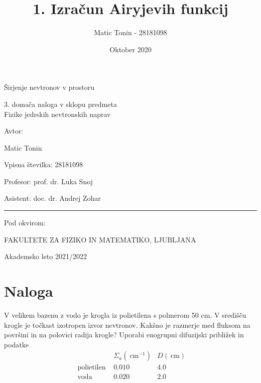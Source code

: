 \documentclass[slovene,11pt,a4paper]{article}
\title{1. Izračun Airyjevih funkcij}
\author{Matic Tonin - 28181098 }
\date{Oktober 2020}
\begin{document}
\begin{center}
\thispagestyle{empty}
\parskip=14pt%
\vspace*{3\parskip}%
\begin{Huge}Širjenje nevtronov v prostoru\end{Huge}


3. domača naloga v sklopu predmeta \\
Fizike jedrskih nevtronskih naprav

Avtor:

Matic Tonin

Vpisna številka: 28181098

Profesor: prof. dr. Luka Snoj

Asistent: doc. dr. Andrej Zohar


\rule{7cm}{0.4pt}

Pod okvirom:

FAKULTETE ZA FIZIKO IN MATEMATIKO, LJUBLJANA

Akademsko leto 2021/2022


\end{center}
\pagebreak
\section*{Naloga}
V velikem bazenu z vodo je krogla iz polietilena s polmerom 50 cm. V središču krogle je točkast izotropen izvor nevtronov. Kakšno je razmerje med fluksom na površini in na polovici radija krogle? Uporabi enogrupni difuzijski približek in podatke
\begin{equation}
\begin{array}{lll} 
& \Sigma_{a}\left(\mathrm{~cm}^{-1}\right) & D(\mathrm{~cm}) \\
\text { polietilen } & 0.010 & 4.0 \\
\text { voda } & 0.020 & 2.0
\end{array}
\end{equation}
\end{document}
